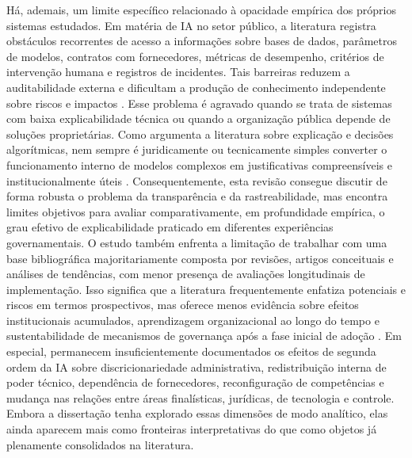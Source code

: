 \documentclass[12pt,a4paper]{article}
\begin{document}
Há, ademais, um limite específico relacionado à opacidade empírica dos próprios sistemas estudados. Em matéria de IA no setor público, a literatura registra obstáculos recorrentes de acesso a informações sobre bases de dados, parâmetros de modelos, contratos com fornecedores, métricas de desempenho, critérios de intervenção humana e registros de incidentes. Tais barreiras reduzem a auditabilidade externa e dificultam a produção de conhecimento independente sobre riscos e impactos \autocite{mkander2023auditing} \autocite{minkkinen2022continuous}. Esse problema é agravado quando se trata de sistemas com baixa explicabilidade técnica ou quando a organização pública depende de soluções proprietárias. Como argumenta a literatura sobre explicação e decisões algorítmicas, nem sempre é juridicamente ou tecnicamente simples converter o funcionamento interno de modelos complexos em justificativas compreensíveis e institucionalmente úteis \autocite{brkan2020legal}. Consequentemente, esta revisão consegue discutir de forma robusta o problema da transparência e da rastreabilidade, mas encontra limites objetivos para avaliar comparativamente, em profundidade empírica, o grau efetivo de explicabilidade praticado em diferentes experiências governamentais.
O estudo também enfrenta a limitação de trabalhar com uma base bibliográfica majoritariamente composta por revisões, artigos conceituais e análises de tendências, com menor presença de avaliações longitudinais de implementação. Isso significa que a literatura frequentemente enfatiza potenciais e riscos em termos prospectivos, mas oferece menos evidência sobre efeitos institucionais acumulados, aprendizagem organizacional ao longo do tempo e sustentabilidade de mecanismos de governança após a fase inicial de adoção \autocite{parycek2023artificial} \autocite{pi2021machine}. Em especial, permanecem insuficientemente documentados os efeitos de segunda ordem da IA sobre discricionariedade administrativa, redistribuição interna de poder técnico, dependência de fornecedores, reconfiguração de competências e mudança nas relações entre áreas finalísticas, jurídicas, de tecnologia e controle. Embora a dissertação tenha explorado essas dimensões de modo analítico, elas ainda aparecem mais como fronteiras interpretativas do que como objetos já plenamente consolidados na literatura.
\end{document}
